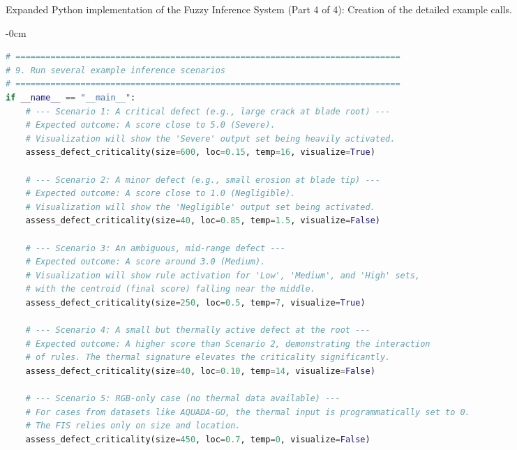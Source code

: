 \documentclass[energies,supfile,submit,pdftex,moreauthors]{Definitions/mdpi}
\begin{document}
\begin{listing}[H]
\caption{Expanded Python implementation of the Fuzzy Inference System (Part 4 of 4): Creation of the detailed example calls.}
\label{lst:scikit-code-part4}
\begin{adjustwidth}{-\extralength}{0cm}
\begin{lstlisting}[language=Python, style=mystyle]
# =============================================================================
# 9. Run several example inference scenarios
# =============================================================================
if __name__ == "__main__":
    # --- Scenario 1: A critical defect (e.g., large crack at blade root) ---
    # Expected outcome: A score close to 5.0 (Severe).
    # Visualization will show the 'Severe' output set being heavily activated.
    assess_defect_criticality(size=600, loc=0.15, temp=16, visualize=True)

    # --- Scenario 2: A minor defect (e.g., small erosion at blade tip) ---
    # Expected outcome: A score close to 1.0 (Negligible).
    # Visualization will show the 'Negligible' output set being activated.
    assess_defect_criticality(size=40, loc=0.85, temp=1.5, visualize=False)

    # --- Scenario 3: An ambiguous, mid-range defect ---
    # Expected outcome: A score around 3.0 (Medium).
    # Visualization will show rule activation for 'Low', 'Medium', and 'High' sets,
    # with the centroid (final score) falling near the middle.
    assess_defect_criticality(size=250, loc=0.5, temp=7, visualize=True)

    # --- Scenario 4: A small but thermally active defect at the root ---
    # Expected outcome: A higher score than Scenario 2, demonstrating the interaction
    # of rules. The thermal signature elevates the criticality significantly.
    assess_defect_criticality(size=40, loc=0.10, temp=14, visualize=False)

    # --- Scenario 5: RGB-only case (no thermal data available) ---
    # For cases from datasets like AQUADA-GO, the thermal input is programmatically set to 0.
    # The FIS relies only on size and location.
    assess_defect_criticality(size=450, loc=0.7, temp=0, visualize=False)
\end{lstlisting}
\end{adjustwidth}
\end{listing}
\end{document}
